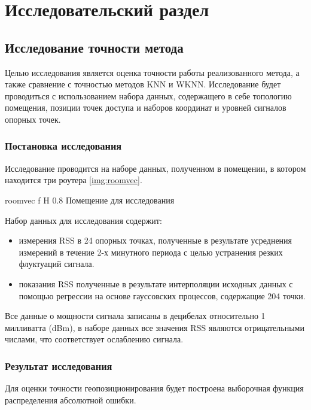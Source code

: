 \chapter{Исследовательский раздел}

\section{Исследование точности метода}

Целью исследования является оценка точности работы реализованного метода, а также сравнение с точностью методов KNN и WKNN. Исследование будет проводиться с использованием набора данных, содержащего в себе топологию помещения, позиции точек доступа и наборов координат и уровней сигналов опорных точек. 

\subsection{Постановка исследования}

Исследование проводится на наборе данных, полученном в помещении, в котором находится три роутера \ref{img:roomvec}.

    {roomvec}
    {f}
    {H}
    {0.8\linewidth}
    {Помещение для исследования}

Набор данных для исследования содержит:
\begin{itemize}[label=---,left=0.49cm]
    \item измерения RSS в 24 опорных точках, полученные в результате усреднения измерений в течение 2-х минутного периода с целью устранения резких флуктуаций сигнала.
    \item показания RSS полученные в результате интерполяции исходных данных с помощью регрессии на основе гауссовских процессов, содержащие 204 точки.
\end{itemize}

Все данные о мощности сигнала записаны в децибелах относительно 1 милливатта (dBm), в наборе данных все значения RSS являются отрицательными числами, что соответствует ослаблению сигнала.

\subsection{Результат исследования}

Для оценки точности геопозиционирования будет построена выборочная функция распределения абсолютной ошибки.

